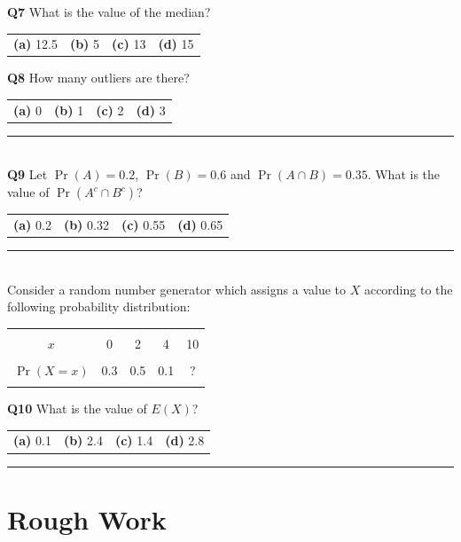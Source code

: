 \documentclass[12pt]{article}
\begin{document}
{\bf Q7} What is the value of the median?\\[0.2cm]
\begin{tabular}{cccc}
{\bf(a)} 12.5 & {\bf(b)} 5 & {\bf(c)} 13 & {\bf(d)} 15 \\[0.6cm]
\end{tabular}

{\bf Q8} How many outliers are there?\\[0.2cm]
\begin{tabular}{cccc}
{\bf(a)} 0 & {\bf(b)} 1 & {\bf(c)} 2 & {\bf(d)} 3 \\[0.6cm]
\end{tabular}

\rule{\linewidth}{1pt}
\quad\\
{\bf Q9} Let $\Pr(A) = 0.2$, $\Pr(B) = 0.6$ and $\Pr(A \cap B) = 0.35$. What is the value of $\Pr(A^c \cap B^c)$? \\[0.2cm]
\begin{tabular}{cccc}
{\bf(a)} 0.2 & {\bf(b)} 0.32 & {\bf(c)} 0.55 & {\bf(d)} 0.65 \\[0.6cm]
\end{tabular}


\rule{\linewidth}{1pt}
\quad\\
Consider a random number generator which assigns a value to $X$ according to the following probability distribution:
\begin{center}
\begin{tabular}{|c|cccc|}
\hline
&&&&\\[-0.4cm]
$x$        & 0 & 2 & 4 & 10 \\
\hline
&&&&\\[-0.4cm]
$\Pr(X=x)$ & 0.3 & 0.5 & 0.1 & ? \\
\hline
\multicolumn{5}{c}{}
\end{tabular}
\end{center}

{\bf Q10} What is the value of $E(X)$?\\[0.2cm]
\begin{tabular}{cccc}
{\bf(a)} 0.1 & {\bf(b)} 2.4 & {\bf(c)} 1.4 & {\bf(d)} 2.8 \\[0.6cm]
\end{tabular}

\rule{\linewidth}{1pt}

\newpage

\section*{Rough Work\\[23cm]}
\end{document}
